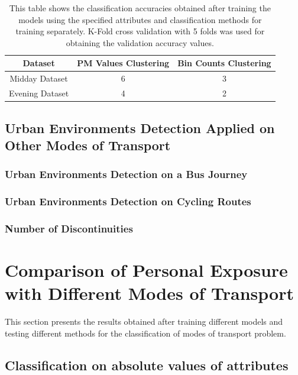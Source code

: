 \documentclass[bsc,frontabs,twoside,singlespacing,parskip,deptreport]{infthesis}     %
\begin{document}
\begin{table}[h!]
\centering
 \begin{tabular}{||c | c | c ||} 
 \hline
 Dataset & PM Values Clustering & Bin Counts Clustering \\ [0.5ex] 
 \hline\hline
 Midday Dataset & 6 & 3 \\ 
 \hline
 Evening Dataset & 4 & 2 \\
 \hline
\end{tabular}
\caption{This table shows the classification accuracies obtained after training the models using the specified attributes and classification methods for training separately. K-Fold cross validation with 5 folds was used for obtaining the validation accuracy values.}
\label{table:discontinuities-meadows}
\end{table}


\subsection{Urban Environments Detection Applied on Other Modes of Transport}
\label{subsec:urban-envs-on-modes-of-transport}

\subsubsection*{Urban Environments Detection on a Bus Journey}

\subsubsection*{Urban Environments Detection on Cycling Routes}

\subsubsection*{Number of Discontinuities}


\section{Comparison of Personal Exposure with Different Modes of Transport}

This section presents the results obtained after training different models and testing different methods for the classification of modes of transport problem.

\subsection{Classification on absolute values of attributes}
\label{subsec:abs-values-models}
\end{document}
